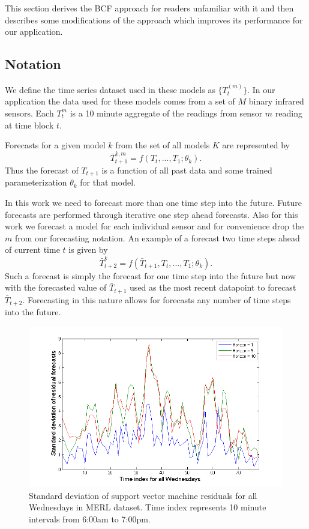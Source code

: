 \documentclass{acm_proc_article-sp}
\begin{document}
This section derives the BCF approach for readers unfamiliar with it and then describes some modifications of the approach which improves its performance for our application.

\subsection{Notation}
We define the time series dataset used in these models as $\{T_{t}^{(m)}\}$.  In our application the data used for these models comes from a set of $M$ binary infrared sensors.  Each $T_{t}^{m}$ is a 10 minute aggregate of the readings from sensor $m$ reading at time block $t$.  

Forecasts for a given model $k$ from the set of all models $K$ are represented by 
\begin{equation}
\bar{T}_{t + 1}^{k, m} = f(T_{t}, ..., T_{1}; \theta_{k}).
\end{equation}
\noindent
Thus the forecast of $T_{t + 1}$ is a function of all past data and some trained parameterization $\theta_{k}$ for that model. 

In this work we need to forecast more than one time step into the future.  Future forecasts are performed through iterative one step ahead forecasts.  Also for this work we forecast a model for each individual sensor and for convenience drop the $m$ from our forecasting notation.  An example of a forecast two time steps ahead of current time $t$ is given by 
\begin{equation}
\bar{T}_{t + 2}^{k} = f(\bar{T}_{t + 1}, T_{t}, ..., T_{1}; \theta_{k}).
\end{equation}
\noindent
Such a forecast is simply the forecast for one time step into the future but now with the forecasted value of $\bar{T}_{t + 1}$ used as the most recent datapoint to forecast $\bar{T}_{t + 2}$.  Forecasting in this nature allows for forecasts any number of time steps into the future. 

\begin{figure}[t]
\centering
\includegraphics[width = .55\linewidth]{svm_standard_deviations_vs_horizon.png}
\caption{Standard deviation of support vector machine residuals for all Wednesdays in MERL dataset.  Time index represents 10 minute intervals from 6:00am to 7:00pm.}
\label{fig:svmstd}
\end{figure}
\end{document}
